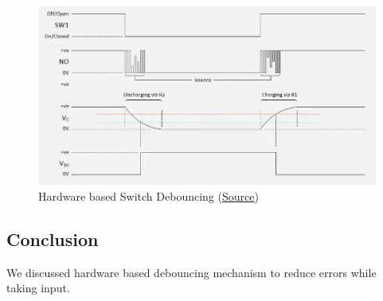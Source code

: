 \documentclass[a4paper]{article} %
\begin{document}
        \begin{figure}[h!]
            \centering
            \includegraphics[width=\textwidth]{Assignment 5/2_hardware debouncing/graph.png}
            \caption{Hardware based Switch Debouncing (\href{https://www.overleaf.com/learn/latex/Hyperlinks}{Source})}
            \label{fg14}
        \end{figure}

    \subsection{Conclusion}
        We discussed hardware based debouncing mechanism to reduce errors while taking input.
\newpage
\end{document}
